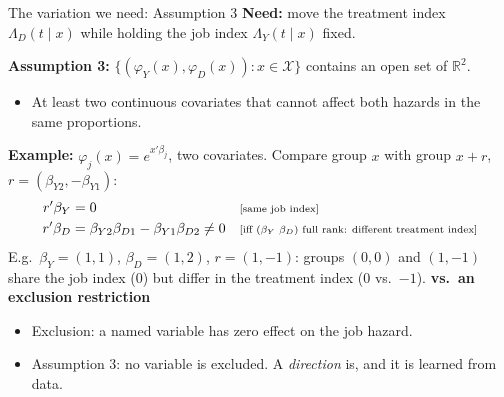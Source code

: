 \documentclass[aspectratio=169,10pt]{beamer}
\newcommand{\why}[1]{\text{\scriptsize[#1]}}
\begin{document}
\begin{frame}[label=m-a3]{The variation we need: Assumption 3}
  \textbf{Need:} move the treatment index $\Lambda_D(t\mid x)$ while holding the job index $\Lambda_Y(t\mid x)$ fixed.

  \medskip
  \textbf{Assumption 3:} $\{(\varphi_Y(x),\varphi_D(x)):x\in\mathcal X\}$ contains an open set of $\mathbb R^2$.
  \begin{itemize}
    \item At least two continuous covariates that cannot affect both hazards in the same proportions.
  \end{itemize}
  \textbf{Example:} $\varphi_j(x)=e^{x'\beta_j}$, two covariates. Compare group $x$ with group $x+r$, $r=(\beta_{Y2},-\beta_{Y1})$:
  \begin{align*}
    r'\beta_Y &= 0 && \why{same job index} \\
    r'\beta_D &= \beta_{Y2}\beta_{D1}-\beta_{Y1}\beta_{D2}\neq0 && \why{iff $(\beta_Y\ \beta_D)$ full rank: different treatment index}
  \end{align*}
  {\small E.g.\ $\beta_Y=(1,1)$, $\beta_D=(1,2)$, $r=(1,-1)$: groups $(0,0)$ and $(1,-1)$ share the job index ($0$) but differ in the treatment index ($0$ vs.\ $-1$).}
  \textbf{vs.\ an exclusion restriction}
  \begin{itemize}
    \item Exclusion: a named variable has zero effect on the job hazard.
    \item Assumption 3: no variable is excluded. A \emph{direction} is, and it is learned from data.
  \end{itemize}
  \vfill\hfill\hyperlink{p-sel}{}
\end{frame}
\end{document}

